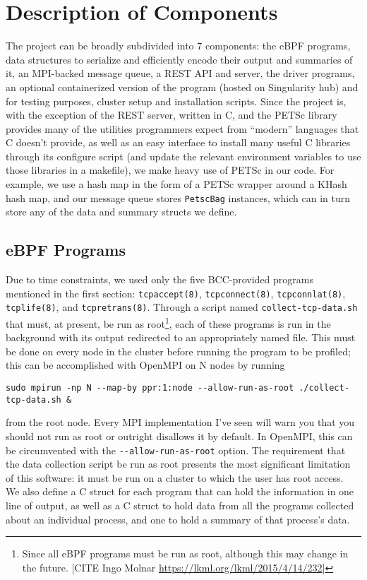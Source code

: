 \documentclass[11pt]{article}
\begin{document}
\section{Description of Components}

The project can be broadly subdivided into 7 components: the eBPF programs, data structures to serialize and efficiently encode their output and summaries of it, an MPI-backed message queue, a REST API and server, the driver programs, an optional containerized version of the program (hosted on Singularity hub) and for testing purposes, cluster setup and installation scripts. Since the project is, with the exception of the REST server, written in C, and the PETSc library provides many of the utilities programmers expect from ``modern'' languages that C doesn't provide, as well as an easy interface to install many useful C libraries through its configure script (and update the relevant environment variables to use those libraries in a makefile), we make heavy use of PETSc in our code. For example, we use a hash map in the form of a PETSc wrapper around a KHash hash map, and our message queue stores \lstinline{PetscBag} instances, which can in turn store any of the data and summary structs we define.
\subsection*{eBPF Programs}
Due to time constraints, we used only the five BCC-provided programs mentioned in the first section: \lstinline{tcpaccept(8)}, \lstinline{tcpconnect(8)}, \lstinline{tcpconnlat(8)}, \lstinline{tcplife(8)}, and \lstinline{tcpretrans(8)}. Through a script named \lstinline{collect-tcp-data.sh} that must, at present, be run as root\footnote{Since all eBPF programs must be run as root, although this may change in the future. [CITE Ingo Molnar \url{https://lkml.org/lkml/2015/4/14/232}]}, each of these programs is run in the background with its output redirected to an appropriately named file. This must be done on every node in the cluster before running the program to be profiled; this can be accomplished with OpenMPI on N nodes by running
\begin{Verbatim}
sudo mpirun -np N --map-by ppr:1:node --allow-run-as-root ./collect-tcp-data.sh &
\end{Verbatim}
from the root node. Every MPI implementation I've seen will warn you that you should not run as root or outright disallows it by default. In OpenMPI, this can be circumvented with the \lstinline{--allow-run-as-root} option. The requirement that the data collection script be run as root presents the most significant limitation of this software: it must be run on a cluster to which the user has root access. \\
We also define a C struct for each program that can hold the information in one line of output, as well as a C struct to hold data from all the programs collected about an individual process, and one to hold a summary of that process's data.
\end{document}
